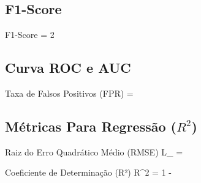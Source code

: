\subsection{F1-Score}

\begin{equacaodestaque}{F1-Score}
     = 2 \times {}
    \label{eq:f1_score}
\end{equacaodestaque}

\subsection{Curva ROC e AUC}

\begin{equacaodestaque}{Taxa de Falsos Positivos (FPR)}
     = 
    \label{eq:fpr}
\end{equacaodestaque}

\subsection{Métricas Para Regressão ($R^2$)}

\begin{equacaodestaque}{Raiz do Erro Quadrático Médio (RMSE)}
    L_{} = 
    \label{eq:rmse}
\end{equacaodestaque}

\begin{equacaodestaque}{Coeficiente de Determinação (R²)}
    R^2 = 1 - 
    \label{eq:r_quadrado}
\end{equacaodestaque}


